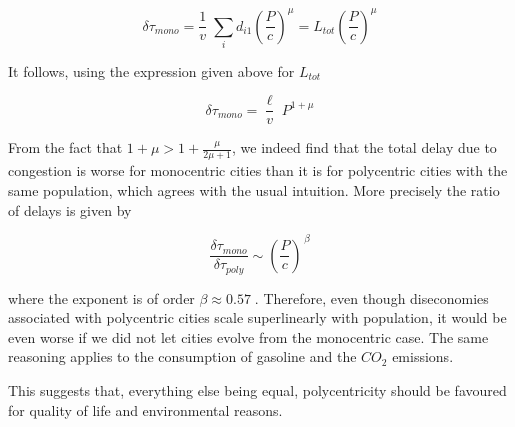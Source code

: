 \begin{equation}
    \delta \tau_{mono} = \frac{1}{v}\; \sum_i d_{i1} \left(\frac{P}{c} \right)^\mu = L_{tot} \left(\frac{P}{c} \right)^\mu
\end{equation}

It follows, using the expression given above for $L_{tot}$

\begin{equation}
    \delta\tau_{mono} = \frac{\ell}{v}\; P^{1+\mu}
\end{equation}

From the fact that $1+\mu > 1+\frac{\mu}{2\mu+1}$, we indeed find that the total
delay due to congestion is worse for monocentric cities than it is for
polycentric cities with the same population, which agrees with the usual
intuition. More precisely the ratio of delays is given by

\begin{equation}
    \frac{\delta\tau_{mono}}{\delta\tau_{poly}}\sim
    \left(\frac{P}{c}\right)^{\,\beta}
\end{equation}

where the exponent is of order $\beta \approx 0.57\;$. Therefore, even though
diseconomies associated with polycentric cities scale superlinearly with
population, it would be even worse if we did not let cities evolve from the
monocentric case. The same reasoning applies to the consumption of gasoline and
the $CO_2$ emissions. 

This suggests that, everything else being equal,
polycentricity should be favoured for quality of life and environmental reasons.

